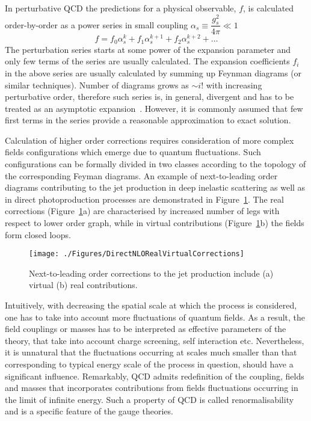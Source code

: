 In perturbative QCD the predictions for a physical observable, $f$, is calculated order-by-order as a power series in small coupling $\alpha_s \equiv \dfrac{g_s^2}{4\pi} \ll 1$
\begin{equation}
   f=f_{0}\alpha^{k}_s + f_{1}\alpha^{k+1}_s + f_{2}\alpha^{k+2}_s + \ldots
	 \label{eq:pertseries}
\end{equation}
The perturbation series starts at some power of the expansion parameter and only few terms of the series are usually calculated. The expansion coefficients $f_i$ in the above series are usually calculated by summing up Feynman diagrams (or similar techniques). Number of diagrams grows as $\sim i!$ with increasing perturbative order, therefore such series is, in general, divergent and has to be treated as an asymptotic expansion~\cite{lipatovQCD}. However, it is commonly assumed that few first terms in the series provide a reasonable approximation to exact solution.

Calculation of higher order corrections requires consideration of more complex fields configurations which emerge due to quantum fluctuations. Such configurations can be formally divided in two classes according to the topology of the corresponding Feyman diagrams. An example of next-to-leading order diagrams contributing to the jet production in deep inelastic scattering as well as in direct photoproduction processes are demonstrated in Figure~\ref{fig:nlojetfeyn}. The real corrections (Figure~\ref{fig:nlojetfeyn}a) are characterised by increased number of legs with respect to lower order graph, while in virtual contributions (Figure~\ref{fig:nlojetfeyn}b) the fields form closed loops.
 
\begin{figure}[h]
 \texttt{[image: ./Figures/DirectNLORealVirtualCorrections]}
\caption{Next-to-leading order corrections to the jet production include (a) virtual (b) real contributions.}
\label{fig:nlojetfeyn}
\end{figure}

Intuitively, with decreasing the spatial scale at which the process is considered, one has to take into account more fluctuations of quantum fields. As a result, the field couplings or masses has to be interpreted as effective parameters of the theory, that take into account charge screening, self interaction etc. Nevertheless, it is unnatural that the fluctuations occurring at scales much smaller than that corresponding to typical energy scale of the process in question, should have a significant influence. Remarkably, QCD admits redefinition of the coupling, fields and masses that incorporates contributions from fields fluctuations occurring in the limit of infinite energy. Such a property of QCD is called renormalisability and is a specific feature of the gauge theories. 

